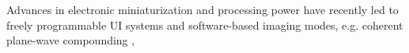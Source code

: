 Advances in
electronic miniaturization and
processing power have recently led to
freely programmable \ac{UI} systems and
software-based  imaging modes, e.g.
coherent plane-wave compounding
\cite{article:MontaldoITUFFC2009},
